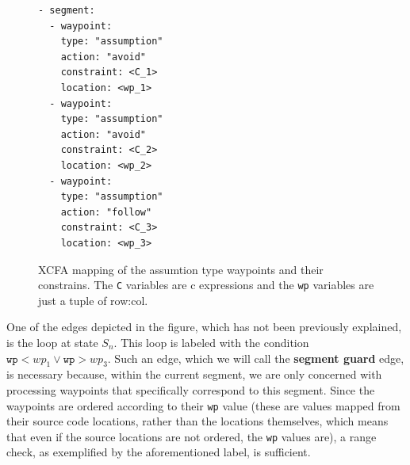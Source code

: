 \begin{figure}[htbp]
  \centering
  \begin{minipage}[t]{0.25\textwidth}
    \begin{lstlisting}[style=c, columns=flexibl]
- segment:
  - waypoint:
    type: "assumption"
    action: "avoid"
    constraint: <C_1>
    location: <wp_1>
  - waypoint:
    type: "assumption"
    action: "avoid"
    constraint: <C_2>
    location: <wp_2>
  - waypoint:
    type: "assumption"
    action: "follow"
    constraint: <C_3>
    location: <wp_3>
    \end{lstlisting}
    \end{minipage}
  \caption{XCFA mapping of the assumtion type waypoints and their constrains. The \texttt{C}
  variables are c expressions and the \texttt{wp} variables are just a tuple of row:col.}
  \label{fig:combined}
\end{figure}

One of the edges depicted in the figure, which has not been previously explained, is the loop at 
state $S_n$. This loop is labeled with the condition $\texttt{wp} < wp_1 \lor \texttt{wp} > wp_3$. Such 
an edge, which we will call the \textbf{segment guard} edge, is necessary because, within the current 
segment, we are only concerned with processing waypoints that specifically correspond to this segment. 
Since the waypoints are ordered according to their \texttt{wp} value (these are values mapped from their 
source code locations, rather than the locations themselves, which means that even if the source locations 
are not ordered, the \texttt{wp} values are), a range check, as exemplified by the aforementioned label, 
is sufficient.

